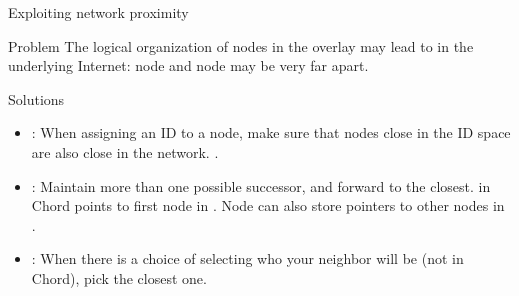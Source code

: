 \begin{slide}{Exploiting network proximity}
  \begin{alertblock}{Problem}
    The logical organization of nodes in the overlay may lead to  in the
    underlying Internet: node  and node  may be very far apart.
  \end{alertblock}
  \begin{block}{Solutions}
    \begin{itemize}
    \item{}: When assigning an ID to a node, make sure that nodes
      close in the ID space are also close in the network. .
    \item{}: Maintain more than one possible successor, and forward to the
      closest. \newline {} in Chord  points to first node in
      . Node  can also store pointers to other nodes in
      .
    \item{}: When there is a choice of selecting who your neighbor
      will be (not in Chord), pick the closest one.
    \end{itemize}
  \end{block}
\end{slide}
